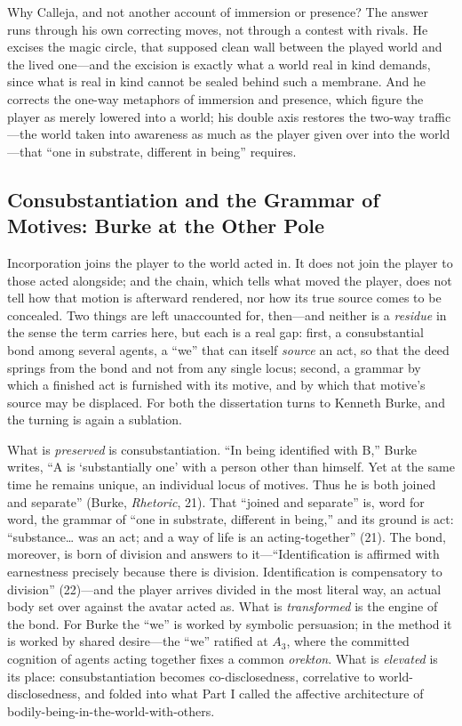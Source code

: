 \documentclass{article}
\begin{document}
Why Calleja, and not another account of immersion or presence? The answer runs through his own correcting moves, not through a contest with rivals. He excises the magic circle, that supposed clean wall between the played world and the lived one---and the excision is exactly what a world real in kind demands, since what is real in kind cannot be sealed behind such a membrane. And he corrects the one-way metaphors of immersion and presence, which figure the player as merely lowered into a world; his double axis restores the two-way traffic---the world taken into awareness as much as the player given over into the world---that ``one in substrate, different in being'' requires.

\subsection{Consubstantiation and the Grammar of Motives: Burke at the Other Pole}

Incorporation joins the player to the world acted in. It does not join the player to those acted alongside; and the chain, which tells what moved the player, does not tell how that motion is afterward rendered, nor how its true source comes to be concealed. Two things are left unaccounted for, then---and neither is a \textit{residue} in the sense the term carries here, but each is a real gap: first, a consubstantial bond among several agents, a ``we'' that can itself \textit{source} an act, so that the deed springs from the bond and not from any single locus; second, a grammar by which a finished act is furnished with its motive, and by which that motive's source may be displaced. For both the dissertation turns to Kenneth Burke, and the turning is again a sublation.

What is \textit{preserved} is consubstantiation. ``In being identified with B,'' Burke writes, ``A is `substantially one' with a person other than himself. Yet at the same time he remains unique, an individual locus of motives. Thus he is both joined and separate'' (Burke, \textit{Rhetoric}, 21). That ``joined and separate'' is, word for word, the grammar of ``one in substrate, different in being,'' and its ground is act: ``substance\ldots{} was an act; and a way of life is an acting-together'' (21). The bond, moreover, is born of division and answers to it---``Identification is affirmed with earnestness precisely because there is division. Identification is compensatory to division'' (22)---and the player arrives divided in the most literal way, an actual body set over against the avatar acted as. What is \textit{transformed} is the engine of the bond. For Burke the ``we'' is worked by symbolic persuasion; in the method it is worked by shared desire---the ``we'' ratified at $A_3$, where the committed cognition of agents acting together fixes a common \textit{orekton}. What is \textit{elevated} is its place: consubstantiation becomes co-disclosedness, correlative to world-disclosedness, and folded into what Part I called the affective architecture of bodily-being-in-the-world-with-others.
\end{document}

